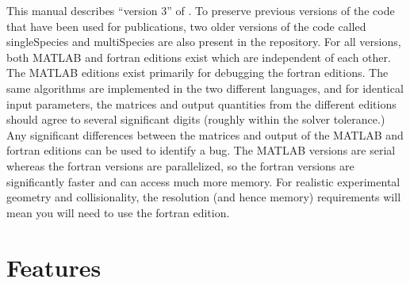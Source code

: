 This manual describes ``version 3'' of \sfincs.  
To preserve previous versions of the code that have been used for publications, two older versions of the
code called singleSpecies and multiSpecies are also present in the repository.  
For all versions, both MATLAB and fortran editions exist which are independent of each other.
The MATLAB editions exist primarily for debugging the fortran editions.
The same algorithms are implemented in the two different languages, and for identical input parameters, 
the matrices and output quantities from the different editions should agree to several significant digits (roughly within the solver tolerance.)
Any significant differences between the matrices and output of the MATLAB and fortran editions can be used to identify a bug.
The MATLAB versions are serial whereas the fortran versions
are parallelized, so the fortran versions are significantly faster and can access much more memory.
For realistic experimental geometry and collisionality, the resolution (and hence memory) requirements will mean
you will need to use the fortran edition.

\section{Features}

